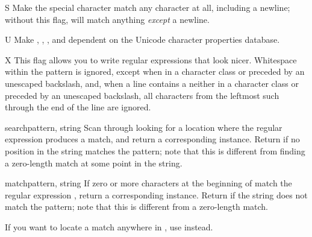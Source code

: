 \begin{datadesc}{S}
Make the  special character match any character at all,
including a newline; without this flag,  will match
anything \emph{except} a newline.
\end{datadesc}

\begin{datadesc}{U}
Make , , , and
 dependent on the Unicode character properties database.
\end{datadesc}

\begin{datadesc}{X}
This flag allows you to write regular expressions that look nicer.
Whitespace within the pattern is ignored, 
except when in a character class or preceded by an unescaped
backslash, and, when a line contains a \character{\#} neither in a character
class or preceded by an unescaped backslash, all characters from the
leftmost such \character{\#} through the end of the line are ignored.
\end{datadesc}


\begin{funcdesc}{search}{pattern, string}
  Scan through  looking for a location where the regular
  expression  produces a match, and return a
  corresponding  instance.
  Return  if no
  position in the string matches the pattern; note that this is
  different from finding a zero-length match at some point in the string.
\end{funcdesc}

\begin{funcdesc}{match}{pattern, string}
  If zero or more characters at the beginning of  match
  the regular expression , return a corresponding
   instance.  Return  if the string does not
  match the pattern; note that this is different from a zero-length
  match.

    If you want to locate a match anywhere in
  , use  instead.
\end{funcdesc}

